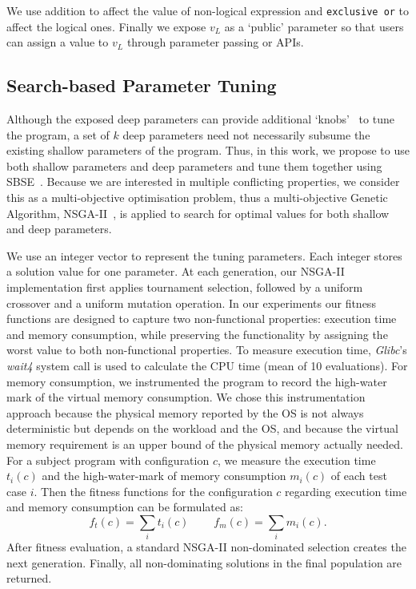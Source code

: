 We use addition to affect the value of non-logical expression and \texttt{exclusive or} to affect the logical ones.
Finally we expose $v_L$ as a `public' parameter so that users can assign a value to $v_L$ through parameter passing or APIs.
\vspace{-0.2em}
\subsection{Search-based Parameter Tuning}
\label{sec_nsgaii}

Although the exposed deep parameters can provide additional `knobs'~\cite{Hoffmann:2011:DKR:1950365.1950390} to tune the program, a set of $k$ deep parameters need not necessarily subsume the existing shallow parameters of the program.  Thus, in this work, we propose to use both shallow parameters and deep parameters and tune them together using SBSE~\cite{Harman:2007:CSF:1253532.1254729}. Because we are interested in multiple conflicting properties, we consider this as a multi-objective optimisation problem, thus a multi-objective Genetic Algorithm, NSGA-II~\cite{996017}, is applied to search for optimal values for both shallow and deep parameters.

We use an integer vector to represent the tuning parameters. Each integer stores a solution value for one parameter. At each generation, our NSGA-II implementation first applies tournament selection, followed by a uniform crossover and a uniform mutation operation. In our experiments our fitness functions are designed to capture two non-functional properties: execution time and memory consumption, while preserving the functionality by assigning the worst value to both non-functional properties. To measure execution time, \emph{Glibc}'s \emph{wait4} system call is used to calculate the CPU time (mean of 10 evaluations). For memory consumption, we instrumented the program to record the high-water mark of the virtual memory consumption. We chose this instrumentation approach because the physical memory reported by the OS is not always deterministic but depends on the workload and the OS, and because the virtual memory requirement is an upper bound of the physical memory actually needed. For a subject program with configuration $c$, we measure the execution time $t_i(c)$ and the high-water-mark of memory consumption $m_i(c)$ of each test case $i$. Then the fitness functions for the configuration $c$ regarding execution time and memory consumption can be formulated as:
$$f_t(c)=\sum_{i} t_i(c) ~~~~~~~~~~f_m(c)=\sum_{i} m_i(c).$$
After fitness evaluation, a standard NSGA-II non-dominated selection creates the next generation. Finally, all non-dominating solutions in the final population are returned.
